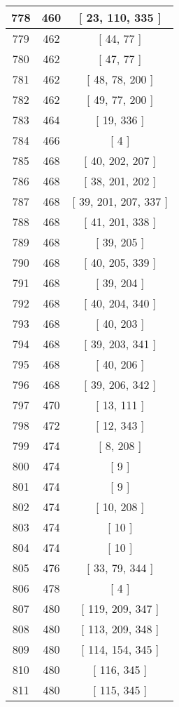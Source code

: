 \begin{center}
\begin{longtable}[H]{|| c c c ||}
\hline
778 & 460 & [ 23, 110, 335 ] \\ 
\hline
779 & 462 & [ 44, 77 ] \\ 
\hline
780 & 462 & [ 47, 77 ] \\ 
\hline
781 & 462 & [ 48, 78, 200 ] \\ 
\hline
782 & 462 & [ 49, 77, 200 ] \\ 
\hline
783 & 464 & [ 19, 336 ] \\ 
\hline
784 & 466 & [ 4 ] \\ 
\hline
785 & 468 & [ 40, 202, 207 ] \\ 
\hline
786 & 468 & [ 38, 201, 202 ] \\ 
\hline
787 & 468 & [ 39, 201, 207, 337 ] \\ 
\hline
788 & 468 & [ 41, 201, 338 ] \\ 
\hline
789 & 468 & [ 39, 205 ] \\ 
\hline
790 & 468 & [ 40, 205, 339 ] \\ 
\hline
791 & 468 & [ 39, 204 ] \\ 
\hline
792 & 468 & [ 40, 204, 340 ] \\ 
\hline
793 & 468 & [ 40, 203 ] \\ 
\hline
794 & 468 & [ 39, 203, 341 ] \\ 
\hline
795 & 468 & [ 40, 206 ] \\ 
\hline
796 & 468 & [ 39, 206, 342 ] \\ 
\hline
797 & 470 & [ 13, 111 ] \\ 
\hline
798 & 472 & [ 12, 343 ] \\ 
\hline
799 & 474 & [ 8, 208 ] \\ 
\hline
800 & 474 & [ 9 ] \\ 
\hline
801 & 474 & [ 9 ] \\ 
\hline
802 & 474 & [ 10, 208 ] \\ 
\hline
803 & 474 & [ 10 ] \\ 
\hline
804 & 474 & [ 10 ] \\ 
\hline
805 & 476 & [ 33, 79, 344 ] \\ 
\hline
806 & 478 & [ 4 ] \\ 
\hline
807 & 480 & [ 119, 209, 347 ] \\ 
\hline
808 & 480 & [ 113, 209, 348 ] \\ 
\hline
809 & 480 & [ 114, 154, 345 ] \\ 
\hline
810 & 480 & [ 116, 345 ] \\ 
\hline
811 & 480 & [ 115, 345 ] \\ 
\hline

\end{longtable}
\end{center}
